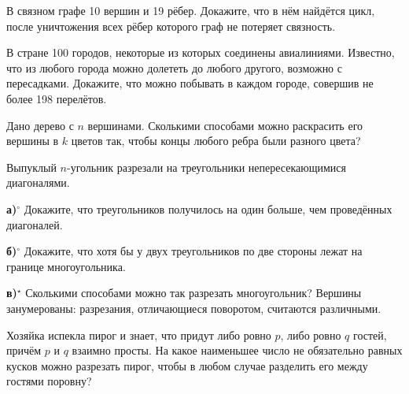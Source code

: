 \documentclass[10pt,a4paper]{article}
\newlength{\shirinaokna}\setlength{\shirinaokna}{12mm}
\newlength{\vysotaokna}\setlength{\vysotaokna}{0.7\baselineskip}
\newcommand{\okno}{\framebox[\shirinaokna]{\rule{0pt}{\vysotaokna}}}
\newlength{\shirinanomera}\setlength{\shirinanomera}{9mm}
\newlength{\zazor}\setlength{\zazor}{0.6em}
\newcommand{\blok}[1]{\par\noindent #1\par}
\newcommand{\nomer}[2]{\makebox[\shirinanomera][l]{%
  \fbox{\rule{0pt}{\vysotaokna}\textbf{#1}$^{#2}$}}}
\begin{document}
\begin{samepage}
\blok{\nomer{11}{}\hspace{\zazor}\okno\hspace{\zazor}В связном графе 10 вершин и 19 рёбер. Докажите, что в нём найдётся цикл, после уничтожения всех рёбер которого граф не потеряет связность.}
\end{samepage}\par\vspace{7pt}
\begin{samepage}
\blok{\nomer{12}{}\hspace{\zazor}\okno\hspace{\zazor}В стране 100 городов, некоторые из которых соединены авиалиниями. Известно, что из любого города можно долететь до любого другого, возможно с пересадками. Докажите, что можно побывать в каждом городе, совершив не более 198 перелётов.}
\end{samepage}\par\vspace{7pt}
\begin{samepage}
\blok{\nomer{13}{}\hspace{\zazor}\okno\hspace{\zazor}Дано дерево с $n$ вершинами. Сколькими способами можно раскрасить его вершины в $k$ цветов так, чтобы концы любого ребра были разного цвета?}
\end{samepage}\par\vspace{7pt}
\begin{samepage}
\blok{\nomer{14}{}\hspace{\zazor}Выпуклый $n$-угольник разрезали на треугольники непересекающимися диагоналями.}
\blok{\okno\hspace{\zazor}\textbf{а)}$^{\circ}$ Докажите, что треугольников получилось на один больше, чем проведённых диагоналей.}
\blok{\okno\hspace{\zazor}\textbf{б)}$^{\circ}$ Докажите, что хотя бы у двух треугольников по две стороны лежат на границе многоугольника.}
\blok{\okno\hspace{\zazor}\textbf{в)}$^{\star}$ Сколькими способами можно так разрезать многоугольник? Вершины занумерованы: разрезания, отличающиеся поворотом, считаются различными.}
\end{samepage}\par\vspace{7pt}
\begin{samepage}
\blok{\nomer{15}{\star}\hspace{\zazor}\okno\hspace{\zazor}Хозяйка испекла пирог и знает, что придут либо ровно $p$, либо ровно $q$ гостей, причём $p$ и $q$ взаимно просты. На какое наименьшее число не обязательно равных кусков можно разрезать пирог, чтобы в любом случае разделить его между гостями поровну?}
\end{samepage}\par\vspace{7pt}
\end{document}

